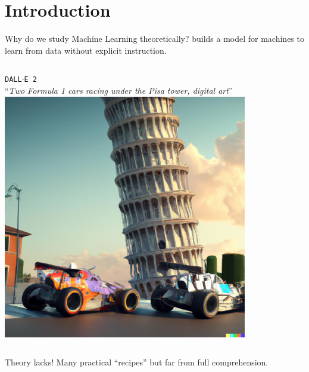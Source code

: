 \documentclass{beamer}
\begin{document}
\hspace*{-1.2cm}
\begin{frame}[plain]
\titlepage %
\end{frame}

\section{Introduction}
\begin{frame}{Why do we study Machine Learning theoretically?}
   builds a model for machines to learn from data without explicit instruction.
  \pause
  \vfill

  \begin{columns}
      \texttt{DALL$\cdot$E 2}~{\cite{ramesh2022hierarchical}} \\
      ``\emph{Two  Formula 1 cars  racing under the Pisa tower, digital art}''
      \includegraphics[width=0.8\textwidth]{figures/dalle.png}
  \end{columns}
  \pause
  \vfill

  \begin{alertblock}{Theory lacks!}
    Many practical ``recipes'' but far from full comprehension.
  \end{alertblock}


\end{frame}
\end{document}
